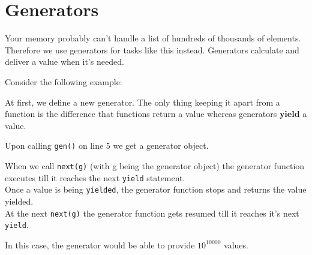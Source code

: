 \section{Generators}
    Your memory probably can't handle a list of hundreds of thousands of elements.
    Therefore we use generators for tasks like this instead.
    Generators calculate and deliver a value when it's needed.
    
    Consider the following example:

    
    At first, we define a new generator.
    The only thing keeping it apart from a function is the difference that functions return a value whereas generators \textbf{yield} a value.
    
    Upon calling \texttt{gen()} on line 5 we get a generator object.
    
    When we call \texttt{next(g)} (with g being the generator object) the generator function executes till it reaches the next \texttt{yield} statement.\\
    Once a value is being \texttt{yielded}, the generator function stops and returns the value yielded.\\
    At the next \texttt{next(g)} the generator function gets resumed till it reaches it's next \texttt{yield}.
    
    In this case, the generator would be able to provide \( 10^{10000} \) values.
    
    